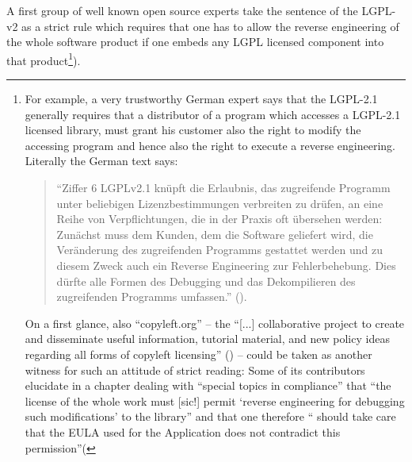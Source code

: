 A first group of well known open source experts take the sentence of the LGPL-v2
as a strict rule which requires that one has to allow the reverse engineering of
the whole software product if one embeds any LGPL licensed component into that
product\footnote{For example, a very trustworthy German expert says that the
LGPL-2.1 generally requires that a distributor of a program which accesses a
LGPL-2.1 licensed library, must grant his customer also the right to modify the
accessing program and hence also the right to execute a reverse engineering.
Literally the German text says: 
\begin{quote}\enquote{Ziffer 6 LGPLv2.1 knüpft die Erlaubnis,
das zugreifende Programm unter beliebigen Lizenzbestimmungen verbreiten zu
drüfen, an eine Reihe von Verpflichtungen, die in der Praxis oft übersehen
werden: Zunächst muss dem Kunden, dem die Software geliefert wird, die
Veränderung des zugreifenden Programms gestattet werden und zu diesem Zweck auch
ein Reverse Engineering zur Fehlerbehebung. Dies dürfte alle Formen des
Debugging und das Dekompilieren des zugreifenden Programms umfassen.}
(\cite[cf.][81]{JaeMet2011a}).\end{quote} On a first glance, also
\enquote{copyleft.org} -- the \enquote{[...] collaborative project to create and
disseminate useful information, tutorial material, and new policy ideas
regarding all forms of copyleft licensing} (\cite[cf.][\nopage
wp.]{CopyLeftOrg2014a}) -- could be taken as another witness for such an
attitude of strict reading: Some of its contributors elucidate in a chapter
dealing with \enquote{special topics in compliance} that \enquote{the license of
the whole work must [sic!] permit \enquote{reverse engineering for debugging
such modifications} to the library} and that one therefore \enquote{ should take
care that the EULA used for the Application does not contradict this
permission}(\cite[cf.][86]{KuhSebGin2014a}}).

